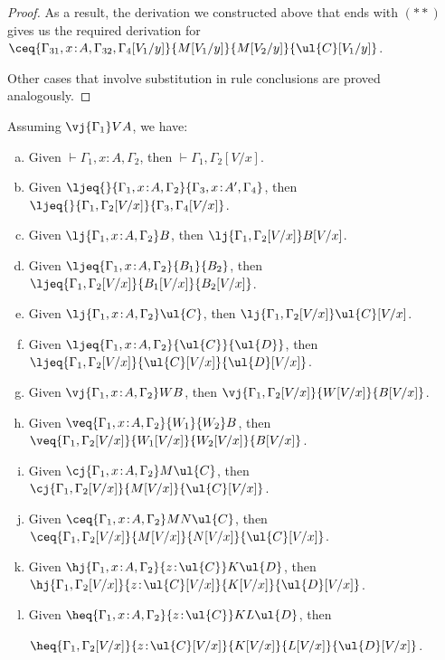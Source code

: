 \begin{proof}
As a result, the derivation we constructed above that ends with $(**)$ gives us the required derivation for
$
\ceq {\Gamma_{31}, x \!:\! A,\Gamma_{32}, \Gamma_4[V_1/y]} {M[V_1/y]} {M[V_2/y]} {\ul{C}[V_1/y]}
$.

Other cases that involve substitution in rule conclusions are proved analogously.
\end{proof}

\begin{theorem} 
\label{thm:substitution}
Assuming $\vj {\Gamma_1} V A$, we have:
\begin{enumerate}[(a)]
\item Given $\vdash {\Gamma_1, x \!:\! A,\Gamma_2}$, then $\vdash {\Gamma_1,\Gamma_2[V/x]}$.
\item Given $\ljeq{} {\Gamma_1, x \!:\! A,\Gamma_2} {\Gamma_3, x \!:\! A',\Gamma_4}$, then $\ljeq {} {\Gamma_1,\Gamma_2[V/x]} {\Gamma_3,\Gamma_4[V/x]}$.
\item Given $\lj {\Gamma_1, x \!:\! A,\Gamma_2} B$, then $\lj {\Gamma_1,\Gamma_2[V/x]} B[V/x]$.
\item Given $\ljeq {\Gamma_1,x \!:\! A,\Gamma_2} {B_1} {B_2}$, then $\ljeq {\Gamma_1,\Gamma_2[V/x]} {B_1[V/x]} {B_2[V/x]}$.
\item Given $\lj {\Gamma_1,x \!:\! A,\Gamma_2} \ul{C}$, then $\lj {\Gamma_1,\Gamma_2[V/x]} \ul{C}[V/x]$.
\item Given $\ljeq {\Gamma_1,x \!:\! A,\Gamma_2} {\ul{C}} {\ul{D}}$, then $\ljeq {\Gamma_1,\Gamma_2[V/x]} {\ul{C}[V/x]} {\ul{D}[V/x]}$.
\item Given $\vj {\Gamma_1,x \!:\! A,\Gamma_2} W B$, then $\vj {\Gamma_1,\Gamma_2[V/x]} {W[V/x]} {B[V/x]}$.
\item Given $\veq {\Gamma_1,x \!:\! A,\Gamma_2} {W_1} {W_2} B$, then $\veq {\Gamma_1,\Gamma_2[V/x]} {W_1[V/x]} {W_2[V/x]} {B[V/x]}$.
\item Given $\cj {\Gamma_1,x \!:\! A,\Gamma_2} M \ul{C}$, then $\cj {\Gamma_1,\Gamma_2[V/x]} {M[V/x]} {\ul{C}[V/x]}$.
\item Given $\ceq {\Gamma_1,x \!:\! A,\Gamma_2} M N \ul{C}$, then $\ceq {\Gamma_1,\Gamma_2[V/x]} {M[V/x]} {N[V/x]} {\ul{C}[V/x]}$.
\item Given $\hj {\Gamma_1,x \!:\! A,\Gamma_2} {z \!:\! \ul{C}} K \ul{D}$, then $\hj {\Gamma_1,\Gamma_2[V/x]} {z \!:\! \ul{C}[V/x]} {K[V/x]} {\ul{D}[V/x]}$.
\item Given $\heq {\Gamma_1,x \!:\! A,\Gamma_2} {z \!:\! \ul{C}} K L \ul{D}$, then 

\hfill$\heq {\Gamma_1,\Gamma_2[V/x]} {z \!:\! \ul{C}[V/x]} {K[V/x]} {L[V/x]} {\ul{D}[V/x]}$.
\end{enumerate}
\end{theorem}


